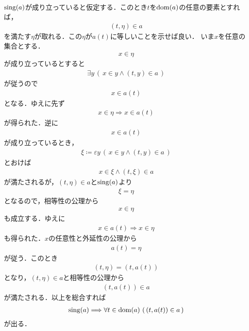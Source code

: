 	\begin{sketch}
		$\operatorname*{sing} (a)$が成り立っていると仮定する．このとき$t$を$\operatorname*{dom} (a)$の任意の要素とすれば，
		\begin{align}
			(t,\eta) \in a
		\end{align}
		を満たす$\eta$が取れる．この$\eta$が$a(t)$に等しいことを示せば良い．
		いま$x$を任意の集合とする．
		\begin{align}
			x \in \eta
		\end{align}
		が成り立っているとすると
		\begin{align}
			\exists y\, (\, x \in y \wedge (t,y) \in a\, )
		\end{align}
		が従うので
		\begin{align}
			x \in a(t)
		\end{align}
		となる．ゆえに先ず
		\begin{align}
			x \in \eta \Longrightarrow x \in a(t)
		\end{align}
		が得られた．逆に
		\begin{align}
			x \in a(t)
		\end{align}
		が成り立っているとき，
		\begin{align}
			\xi \coloneqq \varepsilon y\, (\, x \in y \wedge (t,y) \in a\, )
		\end{align}
		とおけば
		\begin{align}
			x \in \xi \wedge (t,\xi) \in a
		\end{align}
		が満たされるが，$(t,\eta) \in a$と$\operatorname*{sing} (a)$より
		\begin{align}
			\xi = \eta
		\end{align}
		となるので，相等性の公理から
		\begin{align}
			x \in \eta
		\end{align}
		も成立する．ゆえに
		\begin{align}
			x \in a(t) \Longrightarrow x \in \eta
		\end{align}
		も得られた．$x$の任意性と外延性の公理から
		\begin{align}
			a(t) = \eta
		\end{align}
		が従う．このとき
		\begin{align}
			(t,\eta) = (t,a(t))
		\end{align}
		となり，$(t,\eta) \in a$と相等性の公理から
		\begin{align}
			(t,a(t)) \in a
		\end{align}
		が満たされる．以上を総合すれば
		\begin{align}
			\operatorname*{sing} (a) \Longrightarrow \forall t \in \operatorname*{dom} (a)\, \left(\, (t,a(t)) \in a\, \right)
		\end{align}
		が出る．
		\QED
	\end{sketch}
	
